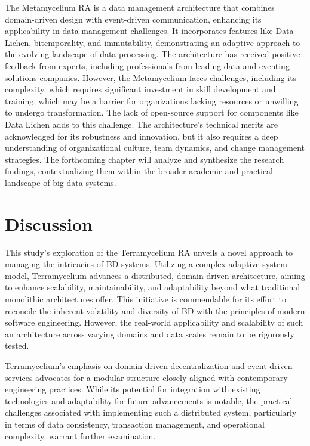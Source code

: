 \documentclass[journal]{IEEEtran}
\begin{document}
The Metamycelium RA is a data management architecture that combines domain-driven design with event-driven communication, enhancing its applicability in data management challenges. It incorporates features like Data Lichen, bitemporality, and immutability, demonstrating an adaptive approach to the evolving landscape of data processing. The architecture has received positive feedback from experts, including professionals from leading data and eventing solutions companies. However, the Metamycelium faces challenges, including its complexity, which requires significant investment in skill development and training, which may be a barrier for organizations lacking resources or unwilling to undergo transformation. The lack of open-source support for components like Data Lichen adds to this challenge. The architecture's technical merits are acknowledged for its robustness and innovation, but it also requires a deep understanding of organizational culture, team dynamics, and change management strategies. The forthcoming chapter will analyze and synthesize the research findings, contextualizing them within the broader academic and practical landscape of big data systems.


\section{Discussion}

This study's exploration of the Terramycelium RA unveils a novel approach to managing the intricacies of BD systems. Utilizing a complex adaptive system model, Terramycelium advances a distributed, domain-driven architecture, aiming to enhance scalability, maintainability, and adaptability beyond what traditional monolithic architectures offer. This initiative is commendable for its effort to reconcile the inherent volatility and diversity of BD with the principles of modern software engineering. However, the real-world applicability and scalability of such an architecture across varying domains and data scales remain to be rigorously tested.

Terramycelium's emphasis on domain-driven decentralization and event-driven services advocates for a modular structure closely aligned with contemporary engineering practices. While its potential for integration with existing technologies and adaptability for future advancements is notable, the practical challenges associated with implementing such a distributed system, particularly in terms of data consistency, transaction management, and operational complexity, warrant further examination.
\end{document}
